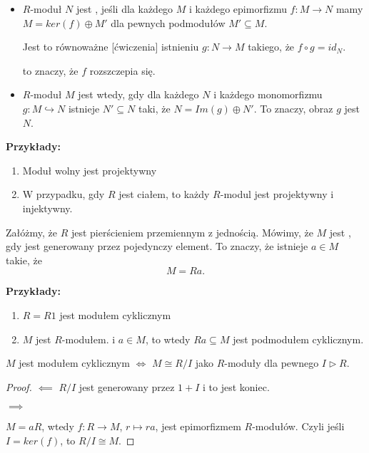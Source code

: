 \begin{definition}$ $

  \begin{itemize}
    \item[\PHtunny] $R$-moduł $N$ jest , jeśli dla każdego $M$ i każdego epimorfizmu $f:M\to N$ mamy $M=ker(f)\oplus M'$ dla pewnych podmodułów $M'\subseteq M$. 

      Jest to równoważne [ćwiczenia] istnieniu $g:N\to M$ takiego, że $f\circ g=id_N$.

      \begin{center}\end{center}

      to znaczy, że $f$ rozszczepia się.
    \item[\PHtunny] $R$-moduł $M$ jest  wtedy, gdy dla każdego $N$ i każdego monomorfizmu $g:M\hookrightarrow N$ istnieje $N'\subseteq N$ taki, że $N=Im(g)\oplus N'$. To znaczy, obraz $g$ jest  $N$.
  \end{itemize}
\end{definition}

\textbf{Przykłady:} 
\begin{enumerate}
  \item Moduł wolny jest projektywny
  \item W przypadku, gdy $R$ jest ciałem, to każdy $R$-modul jest projektywny i injektywny.
\end{enumerate}

\begin{definition}
  Załóżmy, że $R$ jest pierścieniem przemiennym z jednością. Mówimy, że $M$ jest , gdy jest generowany przez pojedynczy element. To znaczy, że istnieje $a\in M$ takie, że
  $$M=Ra.$$
\end{definition}

\textbf{Przykłady:}
\begin{enumerate}
  \item $R=R1$ jest modułem cyklicznym
  \item $M$ jest $R$-modułem. i $a\in M$, to wtedy $Ra\subseteq M$ jest podmodułem cyklicznym.
\end{enumerate}

\begin{remark}
  $M$ jest modułem cyklicznym $\iff$ $M\cong R/I$ jako $R$-moduły dla pewnego $I\triangleright R$.
\end{remark}
\begin{proof}
  $\impliedby$ $R/I$ jest generowany przez $1+I$ i to jest koniec.

  $\implies$

  $M=aR$, wtedy $f:R\to M$, $r\mapsto ra$, jest epimorfizmem $R$-modułów. Czyli jeśli $I=ker(f)$, to $R/I\cong M$.
\end{proof}

